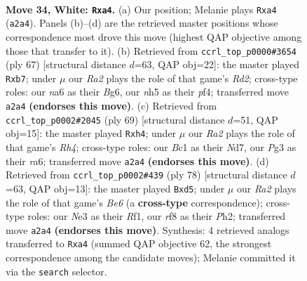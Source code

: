 \documentclass[11pt]{article}
\begin{document}
\clearpage

\begin{figure}[p]\centering
\begin{subfigure}{0.46\textwidth}\centering
\resizebox{\linewidth}{!}{%
\newchessgame
\chessboard[
  setfen={5r1k/6b1/nP6/p6n/b1P5/4N1P1/R7/1RB3K1 w - - 0 34},
  showmover=false,
  pgfstyle=straightmove, color=movearrow, markmove={a2-a4}
]}
\caption{}
\end{subfigure}\hfill
\begin{subfigure}{0.46\textwidth}\centering
\resizebox{\linewidth}{!}{%
\newchessgame
\chessboard[
  setfen={6k1/pB1r2p1/5pb1/8/5PP1/8/PP2RB2/6K1 b - - 0 34},
  showmover=false,
  pgfstyle=straightmove, color=movearrow, markmove={d7-b7}
]}
\caption{}
\end{subfigure}
\\[4pt]
\begin{subfigure}{0.46\textwidth}\centering
\resizebox{\linewidth}{!}{%
\newchessgame
\chessboard[
  setfen={5k2/3n4/R3pp2/1p1b3r/5B1P/4K3/1PB2P2/8 b - - 1 35},
  showmover=false,
  pgfstyle=straightmove, color=movearrow, markmove={h5-h4}
]}
\caption{}
\end{subfigure}\hfill
\begin{subfigure}{0.46\textwidth}\centering
\resizebox{\linewidth}{!}{%
\newchessgame
\chessboard[
  setfen={3r4/6k1/3PBb2/1p1np3/3p4/8/3P3P/5R1K w - - 0 40},
  showmover=false,
  pgfstyle=straightmove, color=movearrow, markmove={e6-d5}
]}
\caption{}
\end{subfigure}
\caption{\textbf{Move 34, White: \texttt{Rxa4}.} (a) Our position; Melanie plays \texttt{Rxa4} (\texttt{a2a4}). Panels (b)--(d) are the retrieved master positions whose correspondence most drove this move (highest QAP objective among those that transfer to it). (b) Retrieved from \texttt{ccrl\_top\_p0000\#3654} (ply 67) [structural distance $d$=63, QAP obj=22]: the master played \texttt{Rxb7}; under $\mu$ our \emph{Ra2} plays the role of that game's \emph{Rd2}; cross-type roles: our \emph{n}a6 as their \emph{B}g6, our \emph{n}h5 as their \emph{p}f4; transferred move \texttt{a2a4} \textbf{(endorses this move)}. (c) Retrieved from \texttt{ccrl\_top\_p0002\#2045} (ply 69) [structural distance $d$=51, QAP obj=15]: the master played \texttt{Rxh4}; under $\mu$ our \emph{Ra2} plays the role of that game's \emph{Rh4}; cross-type roles: our \emph{B}c1 as their \emph{N}d7, our \emph{P}g3 as their \emph{r}a6; transferred move \texttt{a2a4} \textbf{(endorses this move)}. (d) Retrieved from \texttt{ccrl\_top\_p0002\#439} (ply 78) [structural distance $d$=63, QAP obj=13]: the master played \texttt{Bxd5}; under $\mu$ our \emph{Ra2} plays the role of that game's \emph{Be6} (a \textbf{cross-type} correspondence); cross-type roles: our \emph{N}e3 as their \emph{R}f1, our \emph{r}f8 as their \emph{P}h2; transferred move \texttt{a2a4} \textbf{(endorses this move)}. Synthesis: 4 retrieved analogs transferred to \texttt{Rxa4} (summed QAP objective 62, the strongest correspondence among the candidate moves); Melanie committed it via the \texttt{search} selector.}
\label{fig:thought-m66}
\end{figure}
\end{document}
